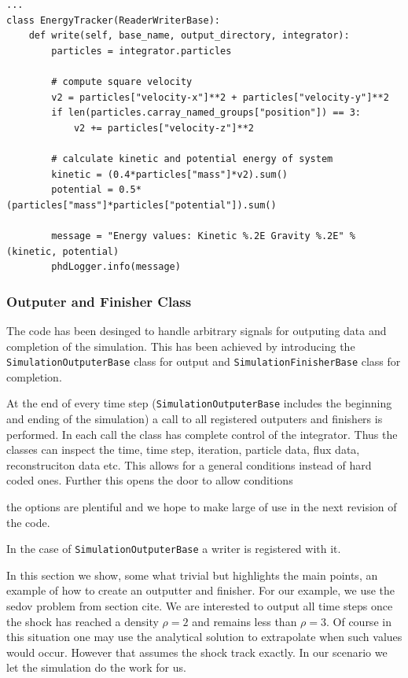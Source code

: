\begin{lstlisting}
...
class EnergyTracker(ReaderWriterBase):
	def write(self, base_name, output_directory, integrator):
   		particles = integrator.particles
        
   		# compute square velocity
        v2 = particles["velocity-x"]**2 + particles["velocity-y"]**2
        if len(particles.carray_named_groups["position"]) == 3:
        	v2 += particles["velocity-z"]**2
            
        # calculate kinetic and potential energy of system    
        kinetic = (0.4*particles["mass"]*v2).sum()
        potential = 0.5*(particles["mass"]*particles["potential"]).sum()
        
        message = "Energy values: Kinetic %.2E Gravity %.2E" % (kinetic, potential)
        phdLogger.info(message)
\end{lstlisting}

\subsubsection{Outputer and Finisher Class}
\label{sec.outputters}

The code has been desinged to handle arbitrary signals for outputing data
and completion of the simulation. This has been achieved by introducing the
\lstinline{SimulationOutputerBase} class for output and
\lstinline{SimulationFinisherBase} class for completion.

At the end of every
time step (\lstinline{SimulationOutputerBase} includes the beginning and ending
of the simulation) a call to all registered outputers and finishers is
performed. In each call the class has complete control of the integrator. Thus
the classes can inspect the time, time step, iteration, particle data, flux data,
reconstruciton data etc. This allows for a general conditions instead of hard
coded ones. Further this opens the door to allow conditions

the options are plentiful and we hope to make large of use in the next
revision of the code.

In the case of \lstinline{SimulationOutputerBase} a writer is registered with it.

In this section we show, some what trivial but highlights the main points, an example of
how to create an outputter and finisher. For our example, we use the sedov problem from 
section cite. We are interested to output all time steps once the shock has reached
a density $\rho=2$ and remains less than $\rho=3$. Of course in this situation one may
use the analytical solution to extrapolate when such values would occur. However that
assumes the shock track exactly. In our scenario we let the simulation do the work
for us.

